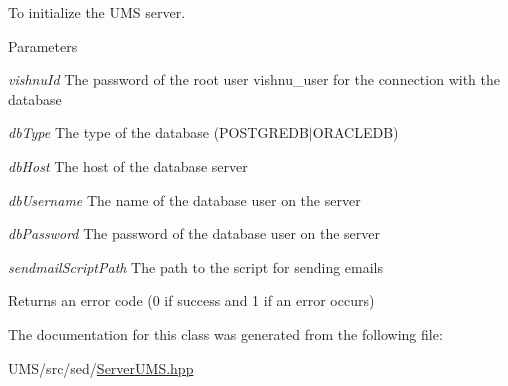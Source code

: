 To initialize the UMS server. 


\begin{DoxyParams}{Parameters}
\item[{\em vishnuId}]The password of the root user vishnu\_\-user for the connection with the database \item[{\em dbType}]The type of the database (POSTGREDB$|$ORACLEDB) \item[{\em dbHost}]The host of the database server \item[{\em dbUsername}]The name of the database user on the server \item[{\em dbPassword}]The password of the database user on the server \item[{\em sendmailScriptPath}]The path to the script for sending emails \end{DoxyParams}
\begin{DoxyReturn}{Returns}
an error code (0 if success and 1 if an error occurs) 
\end{DoxyReturn}


The documentation for this class was generated from the following file:\begin{DoxyCompactItemize}
\item 
UMS/src/sed/\hyperlink{ServerUMS_8hpp}{ServerUMS.hpp}\end{DoxyCompactItemize}
